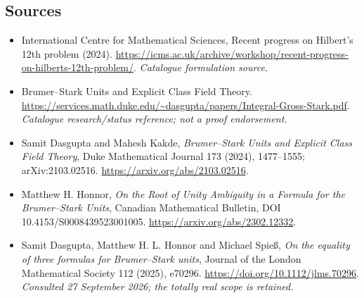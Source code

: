 \documentclass[11pt,a4paper]{article}
\numberwithin{equation}{section}
\begin{document}

\subsection{Sources}
\begin{itemize}\raggedright
\item[\textnormal{[S1]}]\hypertarget{source:36:1}{} International Centre for Mathematical Sciences, Recent progress on Hilbert's 12th problem (2024).
\url{https://icms.ac.uk/archive/workshop/recent-progress-on-hilberts-12th-problem/}.
{\small\textit{Catalogue formulation source.}}
\item[\textnormal{[S2]}]\hypertarget{source:36:2}{} Brumer–Stark Units and Explicit Class Field Theory.
\url{https://services.math.duke.edu/~dasgupta/papers/Integral-Gross-Stark.pdf}.
{\small\textit{Catalogue research/status reference; not a proof endorsement.}}
\item[\textnormal{[E1]}]\hypertarget{extra:36:1}{} Samit Dasgupta and Mahesh Kakde,
\emph{Brumer--Stark Units and Explicit Class Field Theory}, Duke Mathematical
Journal 173 (2024), 1477--1555; arXiv:2103.02516.
\url{https://arxiv.org/abs/2103.02516}.
\item[\textnormal{[E2]}]\hypertarget{extra:36:2}{} Matthew H. Honnor,
\emph{On the Root of Unity Ambiguity in a Formula for the Brumer--Stark Units},
Canadian Mathematical Bulletin, DOI 10.4153/S0008439523001005.
\url{https://arxiv.org/abs/2302.12332}.
\item[\textnormal{[E3]}]\hypertarget{extra:36:3}{} Samit Dasgupta, Matthew H. L. Honnor
and Michael Spie\ss, \emph{On the equality of three formulas for Brumer--Stark units},
Journal of the London Mathematical Society 112 (2025), e70296.
\url{https://doi.org/10.1112/jlms.70296}.
{\small\textit{Consulted 27 September 2026; the totally real scope is retained.}}

\end{itemize}

\end{document}
